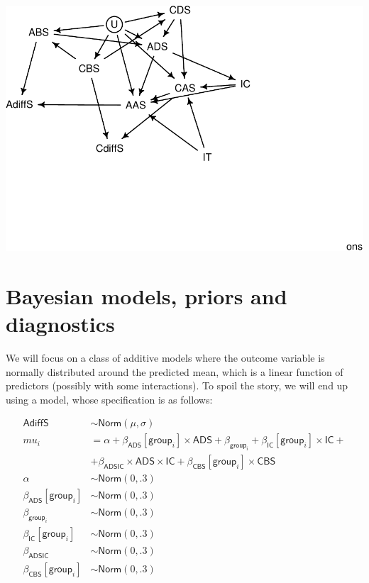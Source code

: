 \documentclass[10pt,dvipsnames,enabledeprecatedfontcommands]{scrartcl}
\begin{document}
\begin{center}\includegraphics[width=1\linewidth]{bayesianReport_files/figure-latex/dag2-1} \end{center}

\section{Bayesian models, priors and
diagnostics}\label{bayesian-models-priors-and-diagnostics}

We will focus on a class of additive models where the outcome variable
is normally distributed around the predicted mean, which is a linear
function of predictors (possibly with some interactions). To spoil the
story, we will end up using a model, whose specification is as follows:

\begin{align*}
\mathsf{AdiffS} & \sim \textsf{Norm}(\mu, \sigma)\\
mu_i & = \alpha + \beta_{\mathsf{ADS}}[\mathsf{group}_i]\times \mathsf{ADS} + \beta_{\mathsf{group}_i}  +
 \beta_{\mathsf{IC}}[\mathsf{group}_i]\times \mathsf{IC} + \\
 & + \beta_{\mathsf{ADSIC}}\times \mathsf{ADS} \times \mathsf{IC} + \beta_{\mathsf{CBS}}[\mathsf{group}_i] \times \mathsf{CBS}\\
 \alpha & \sim \textsf{Norm}(0,.3)\\
\beta_{\mathsf{ADS}}[\mathsf{group}_i] & \sim \textsf{Norm}(0,.3)\\
\beta_{\mathsf{group}_i} & \sim \textsf{Norm}(0,.3)\\
\beta_{\mathsf{IC}}[\mathsf{group}_i] & \sim \textsf{Norm}(0,.3)\\
 \beta_{\mathsf{ADSIC}} & \sim \textsf{Norm}(0,.3)\\
 \beta_{\mathsf{CBS}}[\mathsf{group}_i]& \sim \textsf{Norm}(0,.3)\\
\end{align*}
\end{document}
